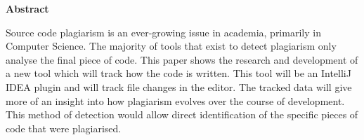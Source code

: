 \thispagestyle{empty}

\begin{center}
    {\LARGE\bf Abstract}
\end{center}

Source code plagiarism is an ever-growing issue in academia, primarily in Computer Science. The majority of tools that exist to detect plagiarism only analyse the final piece of code. This paper shows the research and development of a new tool which will track how the code is written. This tool will be an IntelliJ IDEA plugin and will track file changes in the editor. The tracked data will give more of an insight into how plagiarism evolves over the course of development. This method of detection would allow direct identification of the specific pieces of code that were plagiarised.
